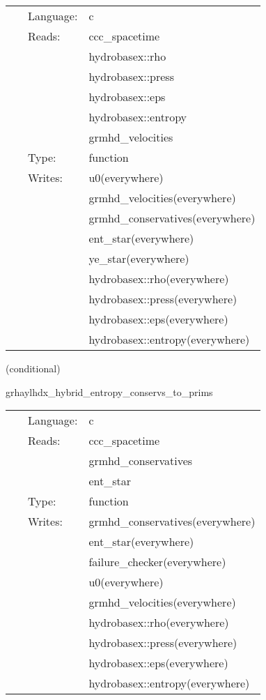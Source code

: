  \begin{tabular*}{160mm}{cll} 
~ & Language:  & c \\ 
~ & Reads:  & ccc\_spacetime \\ 
~& ~ &hydrobasex::rho\\ 
~& ~ &hydrobasex::press\\ 
~& ~ &hydrobasex::eps\\ 
~& ~ &hydrobasex::entropy\\ 
~& ~ &grmhd\_velocities\\ 
~ & Type:  & function \\ 
~ & Writes:  & u0(everywhere) \\ 
~& ~ &grmhd\_velocities(everywhere)\\ 
~& ~ &grmhd\_conservatives(everywhere)\\ 
~& ~ &ent\_star(everywhere)\\ 
~& ~ &ye\_star(everywhere)\\ 
~& ~ &hydrobasex::rho(everywhere)\\ 
~& ~ &hydrobasex::press(everywhere)\\ 
~& ~ &hydrobasex::eps(everywhere)\\ 
~& ~ &hydrobasex::entropy(everywhere)\\ 
\end{tabular*} 


\vspace{5mm}

   (conditional) 

\hspace{5mm} grhaylhdx\_hybrid\_entropy\_conservs\_to\_prims 

\hspace{5mm}{\it entropy+hybrid version of grhaylhdx\_conservs\_to\_prims } 


\hspace{5mm}

 \begin{tabular*}{160mm}{cll} 
~ & Language:  & c \\ 
~ & Reads:  & ccc\_spacetime \\ 
~& ~ &grmhd\_conservatives\\ 
~& ~ &ent\_star\\ 
~ & Type:  & function \\ 
~ & Writes:  & grmhd\_conservatives(everywhere) \\ 
~& ~ &ent\_star(everywhere)\\ 
~& ~ &failure\_checker(everywhere)\\ 
~& ~ &u0(everywhere)\\ 
~& ~ &grmhd\_velocities(everywhere)\\ 
~& ~ &hydrobasex::rho(everywhere)\\ 
~& ~ &hydrobasex::press(everywhere)\\ 
~& ~ &hydrobasex::eps(everywhere)\\ 
~& ~ &hydrobasex::entropy(everywhere)\\ 
\end{tabular*} 


